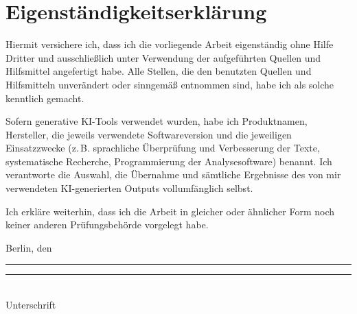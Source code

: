 \section*{Eigenständigkeitserklärung}


Hiermit versichere ich, dass ich die vorliegende Arbeit eigenständig ohne Hilfe Dritter und ausschließlich unter Verwendung der aufgeführten Quellen und Hilfsmittel angefertigt habe. Alle Stellen, die den benutzten Quellen und Hilfsmitteln unverändert oder sinngemäß entnommen sind, habe ich als solche kenntlich gemacht.

Sofern generative KI-Tools verwendet wurden, habe ich Produktnamen, Hersteller, die jeweils verwendete Softwareversion und die jeweiligen Einsatzzwecke (z.\,B. sprachliche Überprüfung und Verbesserung der Texte, systematische Recherche, Programmierung der Analysesoftware) benannt. Ich verantworte die Auswahl, die Übernahme und sämtliche Ergebnisse des von mir verwendeten KI-generierten Outputs vollumfänglich selbst.


Ich erkläre weiterhin, dass ich die Arbeit in gleicher oder ähnlicher Form noch keiner anderen Prüfungsbehörde vorgelegt habe.

\vspace{2cm}

Berlin, den \rule{3cm}{0.4pt}

\vspace{2cm}

\rule{8cm}{0.4pt}\\
Unterschrift
